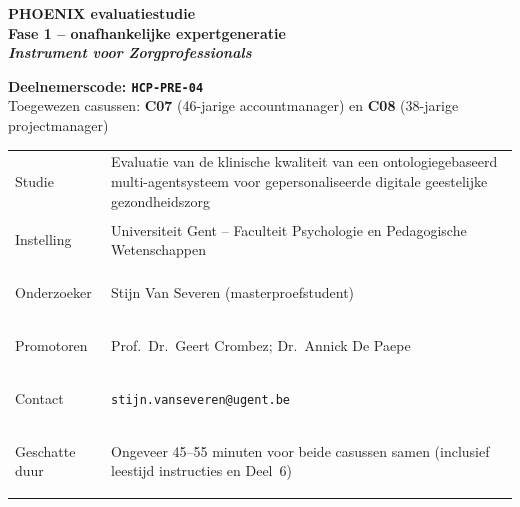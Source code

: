 \documentclass[11pt,a4paper]{article}
\renewcommand{\arraystretch}{1.28}
\begin{document}
\thispagestyle{fancy}
\vspace*{0.3cm}

\begin{tcolorbox}[
  colback=DarkBlue,colframe=DarkBlue,
  arc=3mm,left=14pt,right=14pt,top=12pt,bottom=12pt,
  width=\textwidth
]
\centering
{\fontsize{22}{28}\selectfont\bfseries\color{white}
PHOENIX evaluatiestudie\\[0.3em]
\fontsize{15}{20}\selectfont\color{AccentBlue}
Fase 1 -- onafhankelijke expertgeneratie\\[0.2em]
\fontsize{12}{16}\selectfont\color{white}
\textit{Instrument voor Zorgprofessionals}
}
\end{tcolorbox}

\vspace{0.6cm}

\begin{center}
\begin{tcolorbox}[
  colback=AccentBlue,colframe=PrimaryBlue,
  arc=2.5mm,boxrule=1.2pt,left=12pt,right=12pt,top=10pt,bottom=10pt,
  width=0.86\textwidth
]
\centering
{\large\bfseries\color{DarkBlue}Deelnemerscode: \texttt{HCP-PRE-04}}\\[0.5em]
{\normalsize\color{SlateMid}
Toegewezen casussen:\quad
\textbf{\color{PrimaryBlue}C07} (46-jarige accountmanager)
\quad en \quad
\textbf{\color{PrimaryBlue}C08} (38-jarige projectmanager)
}
\end{tcolorbox}
\end{center}

\vspace{0.5cm}

\begin{center}
\begin{tcolorbox}[
  colback=SoftBG,colframe=BorderGrey,
  arc=2mm,left=10pt,right=10pt,top=9pt,bottom=9pt,
  width=0.92\textwidth
]
\small\renewcommand{\arraystretch}{1.28}
\begin{tabularx}{\textwidth}{@{}>{\bfseries\raggedright\arraybackslash}p{}X@{}}
Studie & Evaluatie van de klinische kwaliteit van een ontologiegebaseerd multi-agentsysteem voor gepersonaliseerde digitale geestelijke gezondheidszorg \\
Instelling & Universiteit Gent -- Faculteit Psychologie en Pedagogische Wetenschappen \\
Onderzoeker & Stijn Van Severen (masterproefstudent) \\
Promotoren & Prof.\ Dr.\ Geert Crombez; Dr.\ Annick De Paepe \\
Contact & \texttt{stijn.vanseveren@ugent.be} \\
Geschatte duur & Ongeveer 45--55 minuten voor beide casussen samen (inclusief leestijd instructies en Deel~6) \\
\end{tabularx}
\end{tcolorbox}
\end{center}
\end{document}
